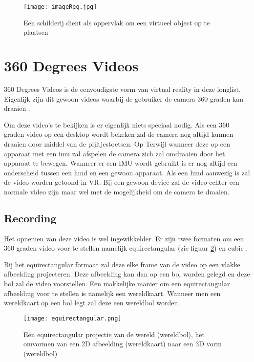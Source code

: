 \begin{figure}
    \texttt{[image: imageReq.jpg]}
    \caption{Een schilderij dient als oppervlak om een virtueel object op te plaatsen \autocite{ARCO2017}}
    \label{fig:imageReq}
\end{figure}

\section{360 Degrees Videos}
360 Degrees Videos is de eenvoudigste vorm van virtual reality in deze longlist. Eigenlijk zijn dit gewoon videos waarbij de gebruiker de camera 360 graden kan draaien \autocite{Hosseini2016}.

Om deze video's te bekijken is er eigenlijk niets speciaal nodig. Als een 360 graden video op een desktop wordt bekeken zal de camera nog altijd kunnen draaien door middel van de pijltjestoetsen. Op Terwijl wanneer deze op een apparaat met een \acrshort{imu} zal afspelen de camera zich zal omdraaien door het apparaat te bewegen. Wanneer er een IMU wordt gebruikt is er nog altijd een onderscheid tussen een \acrshort{hmd} en een gewoon apparaat. Als een \acrshort{hmd} aanwezig is zal de video worden getoond in VR. Bij een gewoon device zal de video echter een normale video zijn maar wel met de mogelijkheid om de camera te draaien.

\subsection{Recording}
Het opnemen van deze video is wel ingewikkelder. Er zijn twee formaten om een 360 graden video voor te stellen namelijk equirectangular (zie figuur \ref{fig:equirectangularprojection}) en cubic \autocite{Lee2010}. 

Bij het equirectangular formaat zal deze elke frame van de video op een vlakke afbeelding projecteren. Deze afbeelding kan dan op een bol worden gelegd en deze bol zal de video voorstellen. Een makkelijke manier om een equirectangular afbeelding voor te stellen is namelijk een wereldkaart. Wanneer men een wereldkaart op een bol legt zal deze een wereldbol worden.
 
\begin{figure}
    \texttt{[image: equirectangular.png]}
    \caption{Een equirectangular projectie van de wereld (wereldbol), het omvormen van een 2D afbeelding (wereldkaart) naar een 3D vorm (wereldbol) \autocite{Brown2017}}
    \label{fig:equirectangularprojection}
\end{figure}

